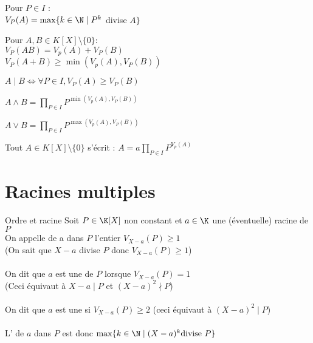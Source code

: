 \documentclass[12pt,a4paper]{report}
\begin{document}
    \begin{propositions}{}{}
    \begin{itemize}
    \begin{multicols}{2}
        \item Pour $P \in I$ : 
        \\$V_P (A)= \max \lbrace k \in \N \mid P^k$ divise $A \rbrace$
        \item Pour $A,B \in K[X] \setminus \lbrace 0 \rbrace :$ \\
        $V_P (AB) = V_p (A) + V_P (B)$ \\
        $V_P (A+B) \geq \min (V_p (A),V_P (B))$
        \item $A \mid B \Longleftrightarrow \forall P \in I, V_P (A) \geq V_P (B)$
        \item $A \wedge B = \displaystyle \prod_{P\in I} P^{\min (V_p (A),V_P (B))}$
        \item $A \vee B = \displaystyle \prod_{P\in I} P^{\max (V_p (A),V_P (B))}$
        \item Tout $A \in K[X]\setminus \lbrace0\rbrace$ s'écrit :  $A = a \displaystyle \prod_{P\in I} P^{V_p (A)}$
    \end{multicols}
        
    \end{itemize}
    \end{propositions}



\section{Racines multiples}
\begin{definition}{Ordre et racine}{}
Soit $P \in \K[X]$ non constant et $a\in \K$ une (éventuelle) racine de $P$\\
On appelle  de a dans $P$ l'entier $V_{X-a}(P)\geq 1$ \\
(On sait que $X-a$ divise $P$ donc $V_{X-a}(P)\geq 1$)\\
\\
On dit que $a$ est une  de $P$ lorsque $V_{X-a} (P) =1$\\
(Ceci équivaut à $X-a \mid P$ et $(X-a)^2 \nmid P$)\\
\\
On dit que $a$ est une  si $V_{X-a}(P) \geq 2$ (ceci équivaut à $(X-a)^2\mid P$) \\
\\
L' de $a$ dans $P$ est donc $\max \lbrace k \in \N \mid (X-a)^k \text{divise } P \rbrace$
\end{definition}
\end{document}
